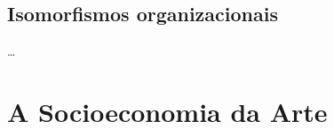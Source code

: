 \documentclass[a4paper, 12pt, openright, oneside, german, french, english, brazil]{abntex2}
\begin{document}
	
	\section{Isomorfismos organizacionais}
		
	\ldots

	
	
	
	
	
	
	\chapter{A Socioeconomia da Arte}
	

\end{document}

